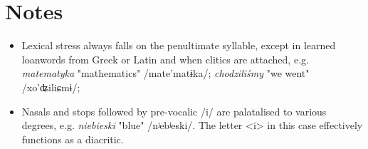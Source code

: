 
\section*{Notes}

\begin{itemize}
    \item Lexical stress always falls on the penultimate syllable, except in learned loanwords from Greek or Latin and when clitics are attached, e.g. \textit{matematyka} "mathematics" /mate'matɨka/; \textit{chodziliśmy} "we went" /xo'ʥiliɕmɨ/; 
    \item Nasals and stops followed by pre-vocalic /i/ are palatalised to various degrees, e.g. \textit{niebieski} "blue" /nʲebʲeski/. The letter <i> in this case effectively functions as a diacritic.
\end{itemize}

